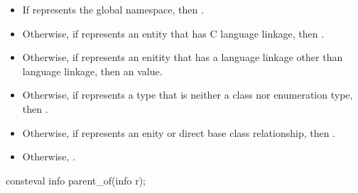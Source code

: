 \begin{itemdescr}
\pnum
\returns
\begin{itemize}
\item
  If  represents the global namespace,
  then .
\item
  Otherwise, if  represents an entity that has C language linkage,
  then .
\item
  Otherwise, if  represents an enitity that has a
  language linkage other than \Cpp{} language linkage,
  then an
  value.
\item
  Otherwise, if  represents a type that is neither a class nor enumeration type,
  then .
\item
  Otherwise, if  represents an enity or direct base class relationship,
  then .
\item
  Otherwise, .
\end{itemize}
\end{itemdescr}

%
\begin{itemdecl}
consteval info parent_of(info r);
\end{itemdecl}

